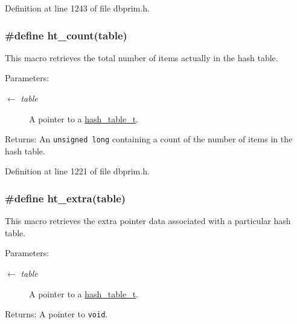 Definition at line 1243 of file dbprim.h.\hypertarget{group__dbprim__hash_ga31}{
\subsubsection[ht\_\-count]{\setlength{\rightskip}{0pt plus 5cm}\#define ht\_\-count(table)}}
\label{group__dbprim__hash_ga31}


This macro retrieves the total number of items actually in the hash table.

\begin{Desc}
\item[Parameters:]
\begin{description}
\item[\mbox{$\leftarrow$} {\em table}]A pointer to a \hyperlink{group__dbprim__hash_ga1}{hash\_\-table\_\-t}.\end{description}
\end{Desc}
\begin{Desc}
\item[Returns:]An {\tt unsigned long} containing a count of the number of items in the hash table.\end{Desc}


Definition at line 1221 of file dbprim.h.\hypertarget{group__dbprim__hash_ga35}{
\subsubsection[ht\_\-extra]{\setlength{\rightskip}{0pt plus 5cm}\#define ht\_\-extra(table)}}
\label{group__dbprim__hash_ga35}


This macro retrieves the extra pointer data associated with a particular hash table.

\begin{Desc}
\item[Parameters:]
\begin{description}
\item[\mbox{$\leftarrow$} {\em table}]A pointer to a \hyperlink{group__dbprim__hash_ga1}{hash\_\-table\_\-t}.\end{description}
\end{Desc}
\begin{Desc}
\item[Returns:]A pointer to {\tt void}.\end{Desc}


